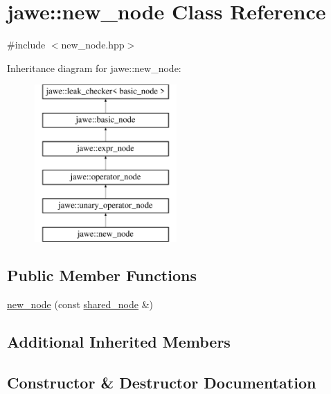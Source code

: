 \hypertarget{classjawe_1_1new__node}{}\section{jawe\+:\+:new\+\_\+node Class Reference}
\label{classjawe_1_1new__node}


{\ttfamily \#include $<$new\+\_\+node.\+hpp$>$}

Inheritance diagram for jawe\+:\+:new\+\_\+node\+:\begin{figure}[H]
\begin{center}
\leavevmode
\includegraphics[height=6.000000cm]{classjawe_1_1new__node}
\end{center}
\end{figure}
\subsection*{Public Member Functions}
\begin{DoxyCompactItemize}
\item 
\hyperlink{classjawe_1_1new__node_a31ceb9410249cedb5905f5282abe8b23}{new\+\_\+node} (const \hyperlink{namespacejawe_a3f307481d921b6cbb50cc8511fc2b544}{shared\+\_\+node} \&)
\end{DoxyCompactItemize}
\subsection*{Additional Inherited Members}


\subsection{Constructor \& Destructor Documentation}
\mbox{\label{classjawe_1_1new__node_a31ceb9410249cedb5905f5282abe8b23}} 

